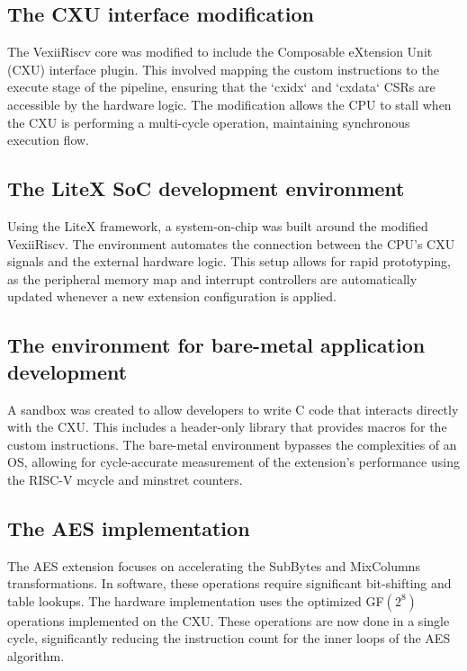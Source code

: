 \subsection{The CXU interface modification}
\label{subsec:cxu_iface_mod}
The VexiiRiscv core was modified to include the Composable eXtension Unit (CXU) interface
plugin. This involved mapping the custom instructions to the execute stage of the pipeline,
ensuring that the `cxidx` and `cxdata` CSRs are accessible by the hardware logic. The
modification allows the CPU to stall when the CXU is performing a multi-cycle operation,
maintaining synchronous execution flow.

\subsection{The LiteX SoC development environment}
\label{subsec:litex_dev_env}
Using the LiteX framework, a system-on-chip was built around the modified VexiiRiscv. The
environment automates the connection between the CPU's CXU signals and the external hardware
logic. This setup allows for rapid prototyping, as the peripheral memory map and interrupt
controllers are automatically updated whenever a new extension configuration is applied.

\subsection{The environment for bare-metal application development}
\label{subsec:baremetal_env}
A sandbox was created to allow developers to write C code that interacts directly with the CXU.
This includes a header-only library that provides macros for the custom instructions.
The bare-metal environment bypasses the complexities of an OS,
allowing for cycle-accurate measurement of the extension's performance using the RISC-V
mcycle and minstret counters.

\subsection{The AES implementation}
\label{subsec:aes_impl}
The AES extension focuses on accelerating the SubBytes and MixColumns transformations.
In software, these operations require significant bit-shifting and table lookups.
The hardware implementation uses the optimized GF$(2^8)$ operations implemented on the CXU.
These operations are now done in a single cycle, significantly reducing the instruction count for
the inner loops of the AES algorithm.

